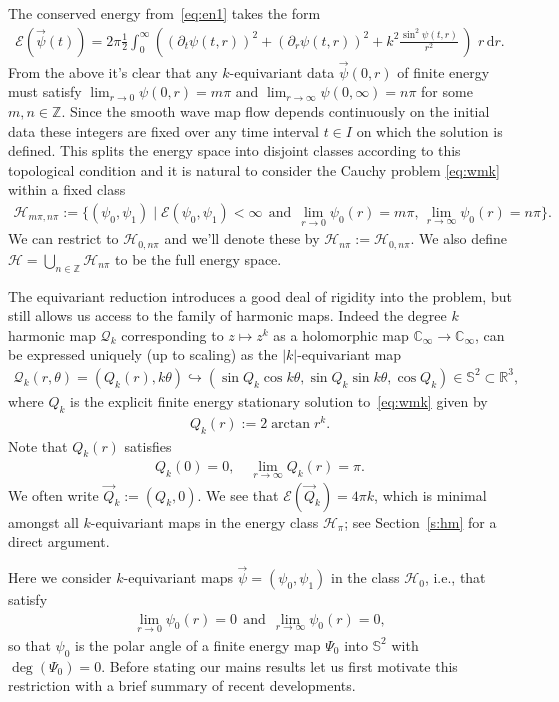 \documentclass[10pt,reqno]{amsart}
\newcommand{\E}{\mathcal{E}}
\newcommand{\HH}{\mathcal{H}}
\newcommand{\QQ}{\mathcal{Q}}
\newcommand{\C}{\mathbb{C}}
\newcommand{\R}{\mathbb{R}}
\newcommand{\Sp}{\mathbb{S}}
\newcommand{\Z}{\mathbb{Z}}
\newcommand{\te}{\theta}
\newcommand{\p}{\partial}
\newcommand{\I}{\infty}
\newcommand{\abs}[1]{\left\lvert{#1}\right\rvert}
\newcommand{\EQ}[1]{\begin{equation}\begin{split} #1 \end{split}\end{equation}}
\numberwithin{equation}{section}
\theoremstyle{remark}
\newcommand{\mand}{{\ \ \text{and} \ \  }}
\newcommand{\rdr}{ \, r \, \mathrm{d}r}
\newcommand{\0}{\emptyset}
\begin{document}
 The conserved energy from~\eqref{eq:en1} takes the form 
\EQ{ \label{eq:en} 
 \E( \vec \psi(t) ) = 2 \pi \frac{1}{2}\int_0^\I  \left( (\p_t \psi (t, r))^2  +  ( \p_r \psi(t, r))^2 + k^2\frac{\sin^2\psi(t, r)}{r^2} \, \right)\,\rdr  .
 }
 From the above it's clear that any $k$-equivariant data  $\vec \psi(0,r)$  of finite energy  must satisfy $\lim_{r \to 0}\psi(0, r) = m\pi$ and  $\lim_{r \to \infty}\psi(0,\infty)=n\pi$  for some $m,n \in \Z$. Since the smooth wave map flow depends continuously on the initial data these integers are fixed over any time interval  $t\in I$ on which the solution is defined. This splits the energy space into disjoint classes according to this topological condition and it is natural to  consider the Cauchy  problem \eqref{eq:wmk} within a fixed class 
\EQ{\label{eq:Hnm}
 \HH_{m \pi, n \pi} := \{ (\psi_0, \psi_1) \mid \E(\psi_0, \psi_1) < \infty \mand \lim_{r \to 0}\psi_0(r) =m\pi, \, \lim_{r \to \infty}\psi_0(r) = n\pi\}. 
}
We can restrict to $\HH_{0, n\pi}$ and we'll denote these by $\HH_{n \pi} := \HH_{0, n \pi}$. We also define $\HH= \bigcup_{n\in \Z} \HH_{n \pi}$ to be the full energy space. 



The equivariant reduction introduces a good deal of rigidity into the problem, but still allows us access to the family of harmonic maps. Indeed the degree $k$ harmonic map $\QQ_k$ corresponding to $z\mapsto z^k$ as a holomorphic map $\C_\infty \to \C_{\infty}$, can be expressed uniquely (up to scaling) as the $\abs{k}$-equivariant map 
\EQ{
\QQ_k(r, \te) = (Q_k(r),  k \te) \hookrightarrow ( \sin Q_k \cos k\theta , \sin Q_k \sin  k \theta, \cos Q_k) \in \Sp^2 \subset \R^3,
}
where $Q_k$ is the explicit finite energy stationary solution to~\eqref{eq:wmk} given by 
 \EQ{
 Q_k(r) := 2 \arctan r^k.
 }
 Note that $Q_k(r)$ satisfies 
 \EQ{\label{eq:degQ}
 Q_k( 0) = 0, \quad  \lim_{r \to \infty} Q_k(r) =  \pi. 
 }
 We often write $\vec Q_k := (Q_k, 0)$.  We see that  $\E(\vec Q_k) = 4\pi k$,  which is minimal amongst all $k$-equivariant maps in the energy class $\HH_\pi$; see Section~\ref{s:hm} for a direct argument. 

  
 
 Here we consider $k$-equivariant maps $\vec \psi = (\psi_0, \psi_1)$ in the class $\HH_0$, i.e., that satisfy
 \EQ{ \label{eq:deg0} 
 \lim_{r \to 0} \psi_0( r) = 0 \mand   \lim_{r \to \infty} \psi_0(r) =  0,  
 }
 so that $\psi_0$ is the polar angle of a finite energy map $\Psi_0$ into $\Sp^2$ with $\deg(\Psi_0) = 0$.  %
 Before stating our mains results let us first motivate this restriction with a brief summary of recent developments.   
  
\end{document}

